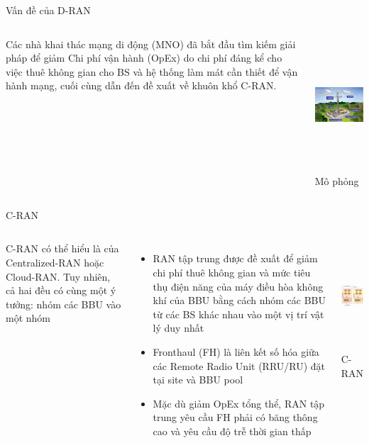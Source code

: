 \begin{frame}{Vấn đề của D-RAN}
  \begin{columns}[T] %
      \vspace{0.6cm}
      Các nhà khai thác mạng di động (MNO) đã bắt đầu tìm kiếm giải pháp để giảm Chi phí vận hành (OpEx) do chi phí đáng kể cho việc thuê không gian cho BS và hệ thống làm mát cần thiết để vận hành mạng, cuối cùng dẫn đến đề xuất về khuôn khổ C-RAN.

      \centering
      \includegraphics[height=5cm, keepaspectratio]{picture/D-RAN_archi.png}
      \\[1ex]
      \small Mô phỏng 
  \end{columns}
\end{frame}


\begin{frame}{C-RAN}
  \begin{columns}[T] %
      C-RAN có thể hiểu là của Centralized-RAN hoặc Cloud-RAN. Tuy nhiên, cả hai đều có cùng một ý tưởng: nhóm các BBU vào một nhóm
      \begin{itemize}
        \item RAN tập trung được đề xuất để giảm chi phí thuê không gian và mức tiêu thụ điện năng của máy điều hòa không khí của BBU bằng cách nhóm các BBU từ các BS khác nhau vào một vị trí vật lý duy nhất
        \item Fronthaul (FH) là liên kết số hóa giữa các Remote Radio Unit (RRU/RU) đặt tại site và BBU pool 
        \item Mặc dù giảm OpEx tổng thể, RAN tập trung yêu cầu FH phải có băng thông cao và yêu cầu độ trễ thời gian thấp
      \end{itemize}

      \centering
      \includegraphics[height=4cm, keepaspectratio]{picture/C-RAN.png}
      \\[1ex]
      \small C-RAN 
  \end{columns}
\end{frame}

